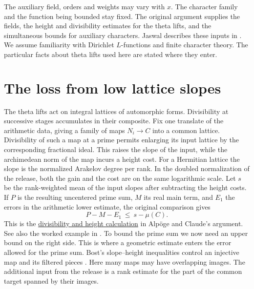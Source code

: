 \documentclass[11pt,letterpaper]{article}
\newcommand{\src}[2]{\href{https://github.com/leanprover-community/riemann-hypothesis/blob/main/src/#1.lean}{#2}}
\numberwithin{equation}{section}
\begin{document}
The auxiliary field, orders and weights may vary with \(x\). The character family and the function being bounded stay fixed. The original argument supplies the fields, the height and divisibility estimates for the theta lifts, and the simultaneous bounds for auxiliary characters. Jaswal describes these inputs in \cite[\S\S3--4]{jaswal}. We assume familiarity with Dirichlet \(L\)-functions and finite character theory. The particular facts about theta lifts used here are stated where they enter.

\section{The loss from low lattice slopes}\label{sec:slopes}

The theta lifts act on integral lattices of automorphic forms. Divisibility at successive stages accumulates in their composite. Fix one translate of the arithmetic data, giving a family of maps \(N_i\to C\) into a common lattice. Divisibility of such a map at a prime permits enlarging its input lattice by the corresponding fractional ideal. This raises the slope of the input, while the archimedean norm of the map incurs a height cost. For a Hermitian lattice the slope is the normalized Arakelov degree per rank. In the doubled normalization of the release, both the gain and the cost are on the same logarithmic scale. Let \(s\) be the rank-weighted mean of the input slopes after subtracting the height costs. If \(P\) is the resulting uncentered prime sum, \(M\) its real main term, and \(E_1\) the errors in the arithmetic lower estimate, the original comparison gives
\begin{equation}\label{eq:squeeze}
             P-M-E_1\ \le\ s-\mu(C).
\end{equation}
This is the \src{Formalism/SizeWindowBrackets/ChainSlopeWindows/LevelOfCongruence}{divisibility and height calculation} in Alpöge and Claude's argument. See also the worked example in \cite[\S3]{theta}. To bound the prime sum we now need an upper bound on the right side. This is where a geometric estimate enters the error allowed for the prime sum. Bost's slope--height inequalities control an injective map and its filtered pieces \cite[Props.~4.5--4.6]{bost}. Here many maps may have overlapping images. The additional input from the release is a rank estimate for the part of the common target spanned by their images.
\end{document}
